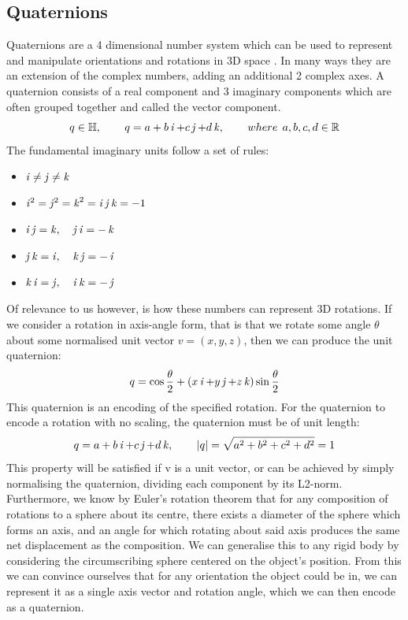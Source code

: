 \subsection{Quaternions}
\label{subsec:quaternions}
Quaternions are a 4 dimensional number system \cite{quaternions} which can be used to represent and manipulate orientations and rotations in 3D space \cite{orientations}. In many ways they are an extension of the complex numbers, adding an additional 2 complex axes. A quaternion consists of a real component and 3 imaginary components which are often grouped together and called the vector component.
$$q \in \operatorname{\mathbb{H}}, \operatorname{\operatorname{\: \: \: \:} \operatorname{\: \: \: \:}} q = a + b\operatorname{\mathit{i}} + c\operatorname{\mathit{j}} + d\operatorname{\mathit{k}}, \operatorname{\operatorname{\: \: \: \:} \operatorname{\: \: \: \:}} where \: \: a,b,c,d \in \operatorname{\mathbb{R}}$$
The fundamental imaginary units follow a set of rules:
\begin{itemize}
    \item $\operatorname{\mathit{i}} \neq \operatorname{\mathit{j}} \neq \operatorname{\mathit{k}}$
    \item $\operatorname{\mathit{i}}^2 = \operatorname{\mathit{j}}^2 = \operatorname{\mathit{k}}^2 = \operatorname{\mathit{i}}\operatorname{\mathit{j}}\operatorname{\mathit{k}} = -1$
    \item $\operatorname{\mathit{i}}\operatorname{\mathit{j}} = \operatorname{\mathit{k}}, \operatorname{\: \: \: \:} \operatorname{\mathit{j}}\operatorname{\mathit{i}} = -\operatorname{\mathit{k}}$
    \item $\operatorname{\mathit{j}}\operatorname{\mathit{k}} = \operatorname{\mathit{i}}, \operatorname{\: \: \: \:} \operatorname{\mathit{k}}\operatorname{\mathit{j}} = -\operatorname{\mathit{i}}$
    \item $\operatorname{\mathit{k}}\operatorname{\mathit{i}} = \operatorname{\mathit{j}}, \operatorname{\: \: \: \:} \operatorname{\mathit{i}}\operatorname{\mathit{k}} = -\operatorname{\mathit{j}}$
\end{itemize}
Of relevance to us however, is how these numbers can represent 3D rotations. If we consider a rotation in axis-angle form, that is that we rotate some angle $\theta$ about some normalised unit vector $v = (x,y,z)$, then we can produce the unit quaternion:
$$q = \cos{\frac{\theta}{2}} + (x\operatorname{\mathit{i}} + y\operatorname{\mathit{j}} + z\operatorname{\mathit{k}}) \sin{\frac{\theta}{2}}$$
This quaternion is an encoding of the specified rotation. For the quaternion to encode a rotation with no scaling, the quaternion must be of unit length:
$$q = a + b\operatorname{\mathit{i}} + c\operatorname{\mathit{j}} + d\operatorname{\mathit{k}}, \operatorname{\operatorname{\: \: \: \:} \operatorname{\: \: \: \:}} |q| = \sqrt{a^2 + b^2 + c^2 + d^2} = 1$$
This property will be satisfied if v is a unit vector, or can be achieved by simply normalising the quaternion, dividing each component by its L2-norm.\\

Furthermore, we know by Euler's rotation theorem \cite{euler-theorem} that for any composition of rotations to a sphere about its centre, there exists a diameter of the sphere which forms an axis, and an angle for which rotating about said axis produces the same net displacement as the composition. We can generalise this to any rigid body by considering the circumscribing sphere centered on the object's position. From this we can convince ourselves that for any orientation the object could be in, we can represent it as a single axis vector and rotation angle, which we can then encode as a quaternion.\\

